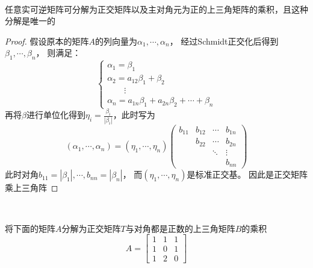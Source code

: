 ~

\begin{theorem}[QR分解]
  任意实可逆矩阵可分解为正交矩阵以及主对角元为正的上三角矩阵的乘积，且这种分解是唯一的
\end{theorem}

\begin{proof}
  假设原本的矩阵$A$的列向量为$\alpha_1,\cdots,\alpha_n$，
  经过Schmidt正交化后得到$\beta_1,\cdots,\beta_n$，
  则满足：
  \begin{equation*}
    \begin{cases}
      \alpha_1 = \beta_1\\
      \alpha_2 = a_{12}\beta_1 + \beta_2\\
      \quad \quad \vdots\\
      \alpha_n = a_{1n}\beta_1 + a_{2n}\beta_2 + \cdots + \beta_n
    \end{cases}
  \end{equation*}
  再将$\beta$进行单位化得到$\eta_i = \frac{\beta_i}{|\beta_i|}$，此时写为
  \begin{equation*}
    (\alpha_1,\cdots,\alpha_n) = (\eta_1,\cdots,\eta_n) \left(
      \begin{array}{cccc}
        b_{11}&b_{12}&\cdots&b_{1n} \\
              &b_{22}&\cdots&b_{2n} \\
              &&\ddots&\vdots \\
              &&&b_{nn}
      \end{array}
    \right)
  \end{equation*}
  此时对角$b_{11} = |\beta_1|,\cdots,b_{nn} = |\beta_n|$，
  而$(\eta_1,\cdots,\eta_n)$是标准正交基。
  因此是正交矩阵乘上三角阵
\end{proof}

~

\begin{exercise}[QR分解]
  将下面的矩阵$A$分解为正交矩阵$T$与对角都是正数的上三角矩阵$B$的乘积
  \begin{equation*}
    A = \left[
      \begin{array}{ccc}
        1&1&1 \\
         1&0&1 \\
         1&2&0
      \end{array}
    \right]
  \end{equation*}
\end{exercise}

